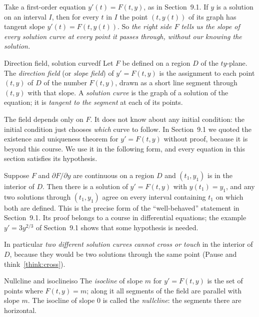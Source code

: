 \documentclass[11pt]{article}
\begin{document}
Take a first-order equation $y'(t)=F(t,y)$, as in Section~9.1. If $y$ is a solution on an interval $I$, then for every $t$ in $I$ the point $(t,y(t))$ of its graph has tangent slope $y'(t)=F(t,y(t))$. So \emph{the right side $F$ tells us the slope of every solution curve at every point it passes through, without our knowing the solution.}

\begin{defn}{Direction field, solution curve}{df}
Let $F$ be defined on a region $D$ of the $ty$-plane. The \emph{direction field} (or \emph{slope field}) of $y'=F(t,y)$ is the assignment to each point $(t,y)$ of $D$ of the number $F(t,y)$, drawn as a short line segment through $(t,y)$ with that slope. A \emph{solution curve} is the graph of a solution of the equation; it is \emph{tangent to the segment} at each of its points.
\end{defn}

The field depends only on $F$. It does not know about any initial condition: the initial condition just chooses \emph{which} curve to follow. In Section~9.1 we quoted the existence and uniqueness theorem for $y'=F(t,y)$ without proof, because it is beyond this course. We use it in the following form, and every equation in this section satisfies its hypothesis.

\begin{remark}
Suppose $F$ and $\partial F/\partial y$ are continuous on a region $D$ and $(t_1,y_1)$ is in the interior of $D$. Then there is a solution of $y'=F(t,y)$ with $y(t_1)=y_1$, and any two solutions through $(t_1,y_1)$ agree on every interval containing $t_1$ on which both are defined. This is the precise form of the ``well-behaved'' statement in Section~9.1. Its proof belongs to a course in differential equations; the example $y'=3y^{2/3}$ of Section~9.1 shows that some hypothesis is needed.
\end{remark}

In particular \emph{two different solution curves cannot cross or touch} in the interior of $D$, because they would be two solutions through the same point (Pause and think~\ref{think:cross}).

\begin{defn}{Nullcline and isocline}{iso}
The \emph{isocline} of slope $m$ for $y'=F(t,y)$ is the set of points where $F(t,y)=m$; along it all segments of the field are parallel with slope $m$. The isocline of slope $0$ is called the \emph{nullcline}: the segments there are horizontal.
\end{defn}
\end{document}
